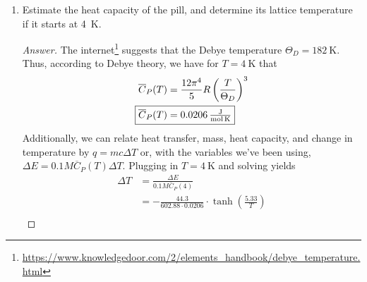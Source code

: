 \documentclass[../psets.tex]{subfiles}
\begin{document}
\begin{enumerate}
\begin{enumerate}
\begin{proof}[Answer]
\begin{align*}
                &= \frac{0.533R}{q}\left[ \e[-5.33/T]-\e[5.33/T] \right]\\
                &= 4.43\cdot\frac{\e[-5.33/T]-\e[5.33/T]}{\e[-5.33/T]+\e[5.33/T]}\\
                &= -4.43\tanh\left( \frac{5.33}{T} \right)
            \end{align*}
            Alternatively, if no external magnetic field is applied, there is only one energy state occupied by every particle with energy that we may take to be 0. It follows that $q=1$, $Q=q^N=1$, $\ln Q=0$, and hence the overall magnetic energy $\prb{E}=0$ (which makes intuitive sense as well).\par
            Thus, assuming that all magnetic energy (i.e., "heat from the lattice") is transferred to the spin degree of freedom upon demagnetization,
            \begin{align*}
                \Delta E &= 0-\prb{E}\\
                \Aboxed{\Delta E &= 4.43\cdot\tanh\left( \frac{5.33}{T} \right)}
            \end{align*}
        \end{proof}
        \item Estimate the heat capacity of the pill, and determine its lattice temperature if it starts at \SI{4}{\kelvin}.
        \begin{proof}[Answer]
            The internet\footnote{\url{https://www.knowledgedoor.com/2/elements_handbook/debye_temperature.html}} suggests that the Debye temperature $\Theta_D=\SI{182}{\kelvin}$. Thus, according to Debye theory, we have for $T=\SI{4}{\kelvin}$ that
            \begin{align*}
                \overline{C}_P(T) &= \frac{12\pi^4}{5}R\left( \frac{T}{\Theta_D} \right)^3\\
                \Aboxed{\overline{C}_P(T)&= \SI[per-mode=fraction,fraction-function=\tfrac]{0.0206}{\joule\per\mole\per\kelvin}}
            \end{align*}
            Additionally, we can relate heat transfer, mass, heat capacity, and change in temperature by $q=mc\Delta T$ or, with the variables we've been using, $\Delta E=0.1M\overline{C}_P(T)\Delta T$. Plugging in $T=\SI{4}{\kelvin}$ and solving yields
            \begin{align*}
                \Delta T &= \frac{\Delta E}{0.1M\overline{C}_P(4)}\\
                &= -\frac{44.3}{602.88\cdot 0.0206}\cdot\tanh\left( \frac{5.33}{T} \right)\\

\end{align*}
\end{proof}
\end{enumerate}
\end{enumerate}
\end{document}
